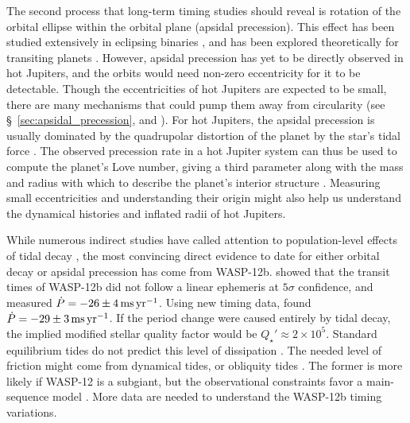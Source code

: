 \documentclass[12pt,twocolumn,tighten]{aastex62}
\begin{document}
The second process that long-term timing studies should reveal is
rotation of the orbital ellipse within the orbital plane (apsidal
precession).  This effect has been studied extensively in eclipsing
binaries \citep[{\it e.g.},][]{
schwarzschild_structure_1958,torres_accurate_2010,borkovits_eclipse_2015}, and has been
explored theoretically for transiting planets
\citep{heyl_using_2007,pal_periastron_2008,jordan_observability_2008,ragozzine_probing_2009}.
However, apsidal precession has yet to be directly observed in hot
Jupiters, and the orbits would need non-zero eccentricity for it to be
detectable.  Though the eccentricities of hot Jupiters are expected to
be small, there are many mechanisms that could pump them away from
circularity (see \S~\ref{sec:apsidal_precession}, and
\citealt{bailey_understanding_2019}).  For hot Jupiters, the apsidal
precession is usually dominated by the quadrupolar distortion of the
planet by the star's tidal force \citep{ragozzine_probing_2009}.  The
observed precession rate in a hot Jupiter system can thus be used to
compute the planet's Love number, giving a third parameter along with
the mass and radius with which to describe the planet's interior
structure \citep[{\it e.g.},][who performed a similar procedure for
HAT-P-13b]{batygin_determination_2009}.  Measuring small
eccentricities and understanding their origin might also help us
understand the dynamical histories and inflated radii of hot Jupiters.
\citep[{\it
e.g.},][respectively]{dawson_origins_2018,ibgui_tidal_2010}

While numerous indirect studies have called attention to
population-level effects of tidal decay
\citep{jackson_observational_2009,hansen_calibration_2010,penev_constraining_2012,husnoo_observational_2012,matsakos_origin_2016,cameron_hierarchical_2018,penev_empirical_2018},
the most convincing direct evidence to date for either orbital decay
or apsidal precession has come from WASP-12b.
\citet{maciejewski_departure_2016} showed that the transit times of
WASP-12b did not follow a linear ephemeris at $5\sigma$ confidence,
and measured $\dot{P} = -26 \pm 4\,{\rm ms}\,{\rm yr}^{-1}$.
Using new timing data, \citet{patra_2017} found
$\dot{P} = -29 \pm 3\,{\rm ms}\,{\rm yr}^{-1}$.  If
the period change were caused entirely by tidal decay, the implied
modified stellar quality factor would be $Q_\star' \approx 2\times10^5$.
Standard equilibrium tides do not predict this
level of dissipation \citep{penev_tidal_2011,ogilvie_tidal_2014}.  The
needed level of friction might come from dynamical tides, or
obliquity tides
\citep{weinberg_tidal_2017,millholland_obliquity_2018}.  The former is
more likely if WASP-12 is a subgiant, but the observational
constraints favor a main-sequence model
\citep{bailey_understanding_2019}.  More data are needed to understand
the WASP-12b timing variations.
\end{document}
